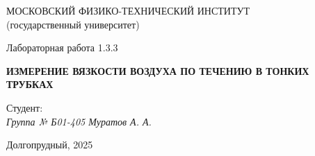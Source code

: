 \thispagestyle{empty}

\begin{center}
    МОСКОВСКИЙ ФИЗИКО-ТЕХНИЧЕСКИЙ ИНСТИТУТ \\
    (государственный университет)
\end{center}

\vfill

\begin{center}
    Лабораторная работа 1.3.3 \\ 
    \vspace{20pt}
    
    \textbf{ИЗМЕРЕНИЕ ВЯЗКОСТИ ВОЗДУХА ПО
ТЕЧЕНИЮ В ТОНКИХ ТРУБКАХ}
\end{center}  

\vfill

    \noindent Студент: \\
    \textit{Группа № Б01-405 \hfill Муратов А. А.}

\vfill

\begin{center}
    Долгопрудный, 2025
\end{center}